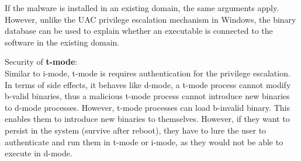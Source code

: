If the malware is installed in an existing domain,
the same arguments apply. However, unlike the UAC privilege escalation
mechanism in Windows, the binary database can be used to explain 
whether an executable is connected to the software in the existing domain.
% 
\medskip

\noindent
Security of {\bf t-mode}: \\
Similar to i-mode, t-mode is requires authentication for the 
privilege escalation.
In terms of side effects, it behaves like d-mode, a t-mode process 
cannot modify b-valid binaries,
thus a malicious t-mode process cannot introduce new binaries to d-mode
processes.
However, t-mode processes can load b-invalid binary.
This enables them to introduce new binaries to themselves.
However, if they want to persist in the system (survive after reboot),
they have to lure the user to authenticate and run them in t-mode or i-mode,
as they would not be able to execute in d-mode.
